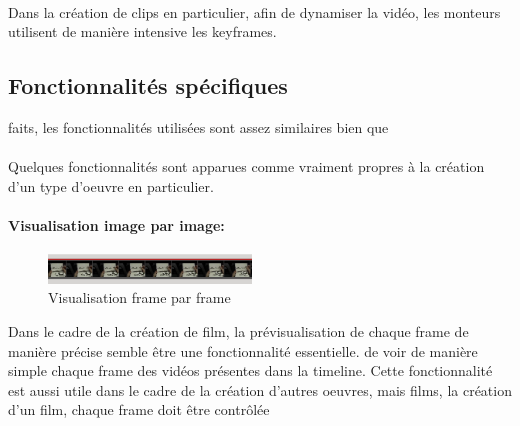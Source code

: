 \paragraph{}

Dans la création de clips en particulier, afin de dynamiser la vidéo,
les monteurs utilisent de manière intensive les keyframes.

\subsection{Fonctionnalités spécifiques} %
faits, les fonctionnalités utilisées sont assez similaires bien que

\paragraph{}

Quelques fonctionnalités sont apparues comme vraiment propres à la
création d'un type d'oeuvre en particulier.

\paragraph{Visualisation image par image:}

\begin{figure}
    \begin{center}
      \includegraphics[width=0.48\textwidth]{images/frameByFrame}
    \end{center} \caption{Visualisation frame par frame} \label{Yes}
\end{figure}

Dans le cadre de la création de film, la prévisualisation de
chaque frame de manière précise semble être une fonctionnalité
essentielle.%
de voir de manière simple chaque frame des vidéos présentes dans
la timeline. Cette fonctionnalité est aussi utile dans le cadre de
la création d'autres oeuvres, mais %
films, %
la création d'un film, chaque frame doit être contrôlée%

